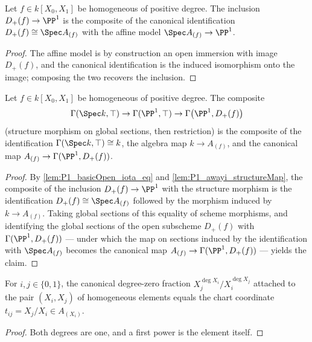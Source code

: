 \begin{lemma}
  \label{lem:P1_basicOpen_iota_eq}
  \leanok
  Let \(f \in k[X_0, X_1]\) be homogeneous of positive degree. The inclusion
  \(D_+(f) \to \PP^1\) is the composite of the canonical identification
  \(D_+(f) \cong \Spec A_{(f)}\) with the affine model \(\Spec A_{(f)} \to \PP^1\).
\end{lemma}
\begin{proof}
  \leanok
  The affine model is by construction an open immersion with image \(D_+(f)\), and the
  canonical identification is the induced isomorphism onto the image; composing the two
  recovers the inclusion.
\end{proof}

\begin{lemma}
  \label{lem:P1_structureMap_appTop_awayToSection}
  \leanok
  Let \(f \in k[X_0, X_1]\) be homogeneous of positive degree. The composite
  \[
    \Gamma(\Spec k, \top) \to \Gamma(\PP^1, \top) \to \Gamma\bigl(\PP^1, D_+(f)\bigr)
  \]
  (structure morphism on global sections, then restriction) is the composite of the
  identification \(\Gamma(\Spec k, \top) \cong k\), the algebra map \(k \to A_{(f)}\), and
  the canonical map \(A_{(f)} \to \Gamma(\PP^1, D_+(f))\).
\end{lemma}
\begin{proof}
  \leanok
  By \ref{lem:P1_basicOpen_iota_eq} and \ref{lem:P1_awayi_structureMap}, the composite of
  the inclusion \(D_+(f) \to \PP^1\) with the structure morphism is the identification
  \(D_+(f) \cong \Spec A_{(f)}\) followed by the morphism induced by \(k \to A_{(f)}\).
  Taking global sections of this equality of scheme morphisms, and identifying the global
  sections of the open subscheme \(D_+(f)\) with \(\Gamma(\PP^1, D_+(f))\) --- under which
  the map on sections induced by the identification with \(\Spec A_{(f)}\) becomes the
  canonical map \(A_{(f)} \to \Gamma(\PP^1, D_+(f))\) --- yields the claim.
\end{proof}

\begin{lemma}
  \label{lem:P1_isLocalizationElem_X_eq}
  \leanok
  For \(i, j \in \{0,1\}\), the canonical degree-zero fraction
  \(X_j^{\deg X_i} / X_i^{\deg X_j}\) attached to the pair \((X_i, X_j)\) of homogeneous
  elements equals the chart coordinate \(t_{ij} = X_j / X_i \in A_{(X_i)}\).
\end{lemma}
\begin{proof}
  \leanok
  Both degrees are one, and a first power is the element itself.
\end{proof}

